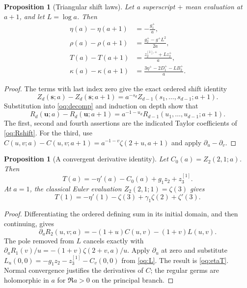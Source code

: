 \documentclass[11pt,a4paper]{article}
\numberwithin{equation}{section}
\newtheorem{proposition}[theorem]{Proposition}
\theoremstyle{definition}
\theoremstyle{remark}
\begin{document}
\begin{proposition}[Triangular shift laws]\label{oq:shift}
Let a superscript $+$ mean evaluation at $a+1$, and let $L=\log a$.
Then
\begin{align}
 \eta(a)-\eta(a+1)&=-\frac{g_1^+}{a},\label{oq:shifteta}\\
 \rho(a)-\rho(a+1)&=\frac{g_2^+-g^+L^2}{2a},\label{oq:shiftrho}\\
 T(a)-T(a+1)&=\frac{z_2^{[1],+}+Lz_2^+}{a},\label{oq:shiftT}\\
 \kappa(a)-\kappa(a+1)&=
 \frac{3\eta^+-2D_1^+-LB_2^+}{a}.\label{oq:shiftkappa}
\end{align}
\end{proposition}
\begin{proof}
The terms with last index zero give the exact ordered shift identity
\[
 Z_d(\mathbf s;a)-Z_d(\mathbf s;a+1)
 =a^{-s_d}Z_{d-1}(s_1,\ldots,s_{d-1};a+1).
\]
Substitution into \eqref{oq:decomp} and induction on depth show that
\begin{equation}\label{oq:Rshift}
 R_d(\mathbf u;a)-R_d(\mathbf u;a+1)
 =a^{-1-u_d}R_{d-1}(u_1,\ldots,u_{d-1};a+1).
\end{equation}
The first, second and fourth assertions are the indicated Taylor
coefficients of \eqref{oq:Rshift}. For the third, use
$C(u,v;a)-C(u,v;a+1)=a^{-1-v}\zeta(2+u,a+1)$ and apply
$\partial_u-\partial_v$.
\end{proof}

\begin{proposition}[A convergent derivative identity]\label{oq:derivative}
Let $C_0(a)=Z_2(2,1;a)$. Then
\begin{equation}\label{oq:etaT}
 T(a)=-\eta'(a)-C_0(a)+g_1z_2+z_3^{[1]}.
\end{equation}
At $a=1$, the classical Euler evaluation $Z_2(2,1;1)=\zeta(3)$ gives
\[
 T(1)=-\eta'(1)-\zeta(3)+\gamma_1\zeta(2)+\zeta'(3).
\]
\end{proposition}
\begin{proof}
Differentiating the ordered defining sum in its initial domain, and
then continuing, gives
\[
 \partial_aR_2(u,v;a)=-(1+u)C(u,v)-(1+v)L(u,v).
\]
The pole removed from $L$ cancels exactly with
$\partial_aR_1(v)/u=-(1+v)\zeta(2+v,a)/u$.
Apply $\partial_u$ at zero and substitute
$L_u(0,0)=-g_1z_2-z_3^{[1]}-C_v(0,0)$ from \eqref{oq:L}.
The result is \eqref{oq:etaT}. Normal convergence justifies the
derivatives of $C$; the regular germs are holomorphic in $a$ for
$\Re a>0$ on the principal branch.
\end{proof}
\end{document}
